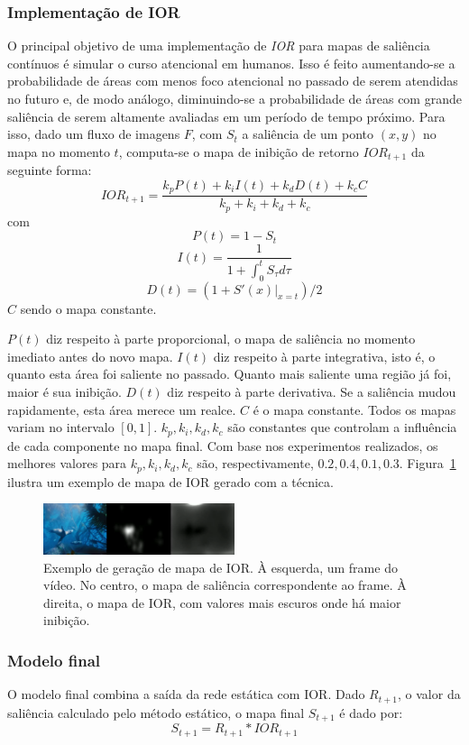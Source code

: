 \documentclass[article]{IEEEtran}
\newcommand{\tit}[1]{\textit{#1}}
\begin{document}
\subsubsection{Implementação de IOR}
O principal objetivo de uma implementação de \tit{IOR} para mapas de
saliência contínuos é simular o curso atencional em humanos.
Isso é feito aumentando-se a probabilidade de áreas com menos foco atencional
no passado de serem atendidas no futuro e, de modo análogo, diminuindo-se
a probabilidade de áreas com grande saliência de serem altamente avaliadas
em um período de tempo próximo.
Para isso, dado um fluxo de imagens $F$, com $S_t$ a saliência de um
ponto $(x, y)$
no mapa no momento $t$, computa-se o mapa de inibição de retorno $IOR_{t+1}$ da
seguinte forma:
$$IOR_{t+1} = \frac{k_pP(t) + k_iI(t) + k_dD(t) + k_cC}
{k_p + k_i + k_d + k_c}$$
com
$$P(t) = 1 - S_t$$
$$I(t) = \frac{1}{1 + \int_{0}^{t} S_\tau d\tau}$$
$$D(t) = (1 + S'(x)|_{x=t})/2$$
$C$ sendo o mapa constante.

$P(t)$ diz respeito à parte proporcional, o mapa de saliência
no momento imediato antes do novo mapa.
$I(t)$ diz respeito à parte integrativa, isto é, o quanto esta área foi
saliente no passado.
Quanto mais saliente uma região já foi, maior é sua inibição.
$D(t)$ diz respeito à parte derivativa. Se a saliência mudou rapidamente,
esta área merece um realce.
$C$ é o mapa constante. Todos os mapas variam no intervalo $[0, 1]$.
$k_p, k_i, k_d, k_c$ são constantes que controlam a influência de
cada componente no mapa final.
Com base nos experimentos realizados, os melhores valores para
$k_p, k_i, k_d, k_c$ são, respectivamente, $0.2, 0.4, 0.1, 0.3$.
Figura~\ref{fig:iorvid} ilustra um exemplo de mapa de IOR gerado com a técnica.

\begin{center}
\begin{figure}[t]
\includegraphics[width=0.5\textwidth]{./img/iorvid.png}
\caption{Exemplo de geração de mapa de IOR.
    À esquerda, um frame do vídeo.
    No centro, o mapa de saliência correspondente ao frame.
    À direita, o mapa de IOR, com valores mais escuros onde há maior inibição.}
\label{fig:iorvid}
\end{figure}
\end{center}

\subsubsection{Modelo final}
O modelo final combina a saída da rede estática com IOR.
Dado $R_{t+1}$, o valor da saliência calculado pelo método estático,
o mapa final $S_{t+1}$ é dado por:
$$S_{t+1} = R_{t+1}*IOR_{t+1}$$
\end{document}
